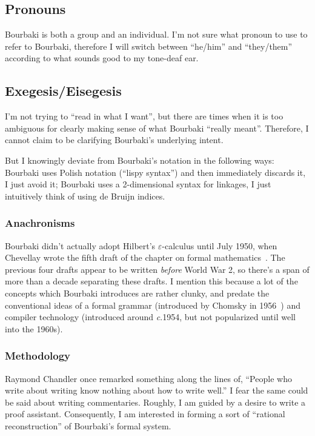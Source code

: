 \documentclass{amsart}
\begin{document}
\subsection{Pronouns}
Bourbaki is both a group and an individual. I'm not sure what pronoun to
use to refer to Bourbaki, therefore I will switch between ``he/him'' and
``they/them'' according to what sounds good to my tone-deaf ear.

\subsection{Exegesis/Eisegesis}
I'm not trying to ``read in what I want'', but there are times when it
is too ambiguous for clearly making sense of what Bourbaki ``really meant''.
Therefore, I cannot claim to be clarifying Bourbaki's underlying intent.

But I knowingly deviate from Bourbaki's notation in the following ways:
Bourbaki uses Polish notation (``lispy syntax'') and then immediately
discards it, I just avoid it; Bourbaki uses a 2-dimensional syntax for
linkages, I just intuitively think of using de Bruijn indices.

\subsubsection{Anachronisms}
Bourbaki didn't actually adopt Hilbert's $\varepsilon$-calculus until
July 1950, when Chevellay wrote the fifth draft of the chapter on formal
mathematics~\cite{archives-no139}. The previous four drafts appear to be
written \emph{before} World War 2, so there's a span of more than a
decade separating these drafts. I mention this because a lot of the
concepts which Bourbaki introduces are rather clunky, and predate the
conventional ideas of a formal grammar (introduced by Chomsky in 1956~\cite{chomsky1956})
and compiler technology (introduced around \textit{c}.1954, but not popularized
until well into the 1960s).

\subsubsection{Methodology}
Raymond Chandler once remarked something along the lines of, ``People
who write about writing know nothing about how to write well.'' I fear
the same could be said about writing commentaries. Roughly, I am guided
by a desire to write a proof assistant. Consequently, I am interested in
forming a sort of ``rational reconstruction'' of Bourbaki's formal system.
\end{document}
